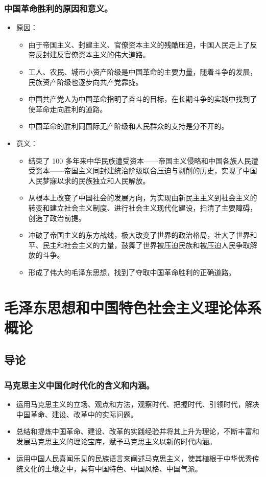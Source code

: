 \documentclass{article}
\begin{document}
\subsubsection{中国革命胜利的原因和意义。}
\begin{itemize}
    \item 原因：
    \begin{itemize}
        \item 由于帝国主义、封建主义、官僚资本主义的残酷压迫，中国人民走上了反帝反封建反官僚资本主义的伟大道路。
        \item 工人、农民、城市小资产阶级是中国革命的主要力量，随着斗争的发展，民族资产阶级也逐步向共产党靠拢。
        \item 中国共产党人为中国革命指明了奋斗的目标，在长期斗争的实践中找到了使革命走向胜利的道路。
        \item 中国革命的胜利同国际无产阶级和人民群众的支持是分不开的。
    \end{itemize}
    \item 意义：
    \begin{itemize}
        \item 结束了 100 多年来中华民族遭受资本——帝国主义侵略和中国各族人民遭受资本——帝国主义同封建统治阶级联合压迫与剥削的历史，实现了中国人民梦寐以求的民族独立和人民解放。
        \item 从根本上改变了中国社会的发展方向，为实现由新民主主义到社会主义的转变和建立社会主义制度、进行社会主义现代化建设，扫清了主要障碍，创造了政治前提。
        \item 冲破了帝国主义的东方战线，极大改变了世界的政治格局，壮大了世界和平、民主和社会主义的力量，鼓舞了世界被压迫民族和被压迫人民争取解放的斗争。
        \item 形成了伟大的毛泽东思想，找到了夺取中国革命胜利的正确道路。
    \end{itemize}
\end{itemize}

\newpage

\section{毛泽东思想和中国特色社会主义理论体系概论}

\subsection{导论}

\subsubsection{马克思主义中国化时代化的含义和内涵。}
\begin{itemize}
    \item 运用马克思主义的立场、观点和方法，观察时代、把握时代、引领时代，解决中国革命、建设、改革中的实际问题。
    \item 总结和提炼中国革命、建设、改革的实践经验并将其上升为理论，不断丰富和发展马克思主义的理论宝库，赋予马克思主义以新的时代内涵。
    \item 运用中国人民喜闻乐见的民族语言来阐述马克思主义，使其植根于中华优秀传统文化的土壤之中，具有中国特色、中国风格、中国气派。
\end{itemize}
\end{document}

